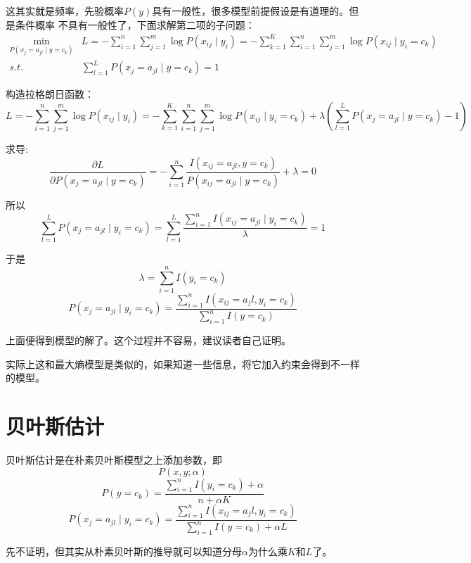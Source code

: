 \documentclass{article}
\begin{document}
    这其实就是频率，先验概率$P(y)$具有一般性，很多模型前提假设是有道理的。但是条件概率
    不具有一般性了，下面求解第二项的子问题：
    \begin{align*}
        \min_{P(x_j=a_{jl}\mid y=c_k)}&L=-\sum_{i=1}^{n}\sum_{j=1}^{m}\log P(x_{ij}\mid y_i)=-\sum_{k=1}^{K}\sum_{i=1}^{n}\sum_{j=1}^{m}\log P(x_{ij}\mid y_i=c_k) \\
        s.t. &\sum_{l=1}^{L}P(x_{j}=a_{jl}\mid y=c_k)=1
    \end{align*}

    构造拉格朗日函数：
    \[L=-\sum_{i=1}^{n}\sum_{j=1}^{m}\log P(x_{ij}\mid y_i)=-\sum_{k=1}^{K}\sum_{i=1}^{n}\sum_{j=1}^{m}\log P(x_{ij}\mid y_i=c_k)+\lambda(\sum_{l=1}^{L}P(x_{j}=a_{jl}\mid y=c_k)-1) \]

    求导:
    \[\frac{\partial L}{\partial P(x_j=a_{jl}\mid y=c_k)}=-\sum_{i=1}^{n}\frac{I(x_{ij}=a_{jl},y=c_k)}{P(x_{ij}=a_{jl}\mid y=c_k)}+\lambda=0\]

    所以
    \[\sum_{l=1}^{L}P(x_j=a_{jl}\mid y_i=c_k)=\sum_{l=1}^{L}\frac{\sum_{i=1}^{n}I(x_{ij}=a_{jl}\mid y_i=c_k)}{\lambda}=1\]

    于是
    \[\lambda=\sum_{i=1}^{n}I(y_i=c_k)\]
    \[P(x_j=a_{jl}\mid y_i=c_k)=\frac{\sum_{i=1}^{n}I(x_{ij}=a_jl,y_i=c_k)}{\sum_{i=1}^{n}I(y=c_k)}\]

    上面便得到模型的解了。这个过程并不容易，建议读者自己证明。

    实际上这和最大熵模型是类似的，如果知道一些信息，将它加入约束会得到不一样的模型。

    \section{贝叶斯估计}
    贝叶斯估计是在朴素贝叶斯模型之上添加参数，即
    \[P(x,y;\alpha)\]
    \[P(y=c_k)=\frac{\sum_{i=1}^{n}I(y_i=c_k)+\alpha}{n+\alpha K}\]
    \[P(x_j=a_{jl}\mid y_i=c_k)=\frac{\sum_{i=1}^{n}I(x_{ij}=a_jl,y_i=c_k)}{\sum_{i=1}^{n}I(y=c_k)+\alpha L}\]

    先不证明，但其实从朴素贝叶斯的推导就可以知道分母$\alpha$为什么乘$K$和$L$了。
    
\end{document}
